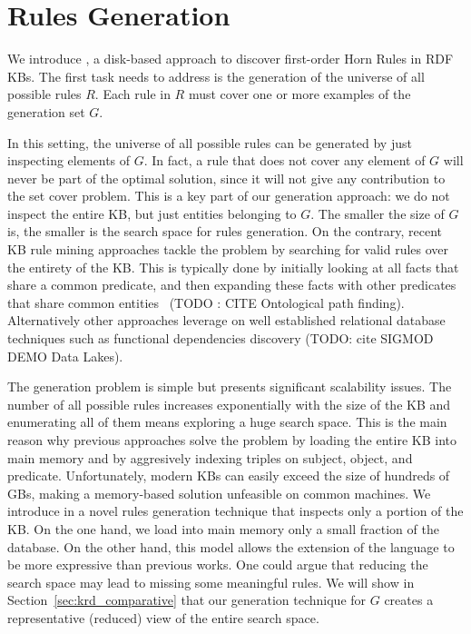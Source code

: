 \section{Rules Generation} \label{sec:rules_gen}
We introduce \krd, a disk-based approach to discover first-order Horn Rules in RDF KBs. The first task \krd needs to address is the generation of the universe of all possible rules $R$. Each rule in $R$ must cover one or more examples of the generation set $G$.

In this setting, the universe of all possible rules can be generated by just inspecting elements of $G$. In fact, a rule that does not cover any element of $G$ will never be part of the optimal solution, since it will not give any contribution to the set cover problem. This is a key part of our generation approach: we do not inspect the entire KB, but just entities belonging to $G$. The smaller the size of $G$ is, the smaller is the search space for rules generation. On the contrary, recent KB rule mining approaches tackle the problem by searching for valid rules over the entirety of the KB. This is typically done by initially looking at all facts that share a common predicate, and then expanding these facts with other predicates that share common entities~\cite{galarraga2015fast} (TODO : CITE Ontological path finding). Alternatively other approaches leverage on well established relational database techniques such as functional dependencies discovery (TODO: cite SIGMOD DEMO Data Lakes). 

The generation problem is simple but presents significant scalability issues. The number of all possible rules increases exponentially with the size of the KB and enumerating all of them means exploring a huge search space. This is the main reason why previous approaches solve the problem by loading the entire KB into main memory and by aggresively indexing triples on subject, object, and predicate. Unfortunately, modern KBs can easily exceed the size of hundreds of GBs, making a memory-based solution unfeasible on common machines. We introduce in \krd a novel rules generation technique that inspects only a portion of the KB. On the one hand, we load into main memory only a small fraction of the database. On the other hand, this model allows the extension of the language to be more expressive than previous works. One could argue that reducing the search space may lead to missing some meaningful rules. We will show in Section~\ref{sec:krd_comparative} that our generation technique for $G$ creates a representative (reduced) view of the entire search space.

